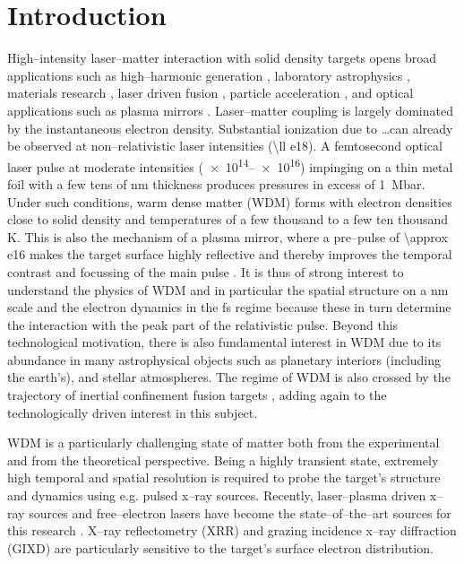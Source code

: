\documentclass[preprint, 12pt]{elsarticle}
\begin{document}
\section{Introduction}
\label{S:1}

High--intensity laser--matter interaction with solid density targets opens
broad applications such as high--harmonic generation \cite{}, laboratory
astrophysics \cite{}, materials research \cite{}, laser driven fusion
\cite{}, particle acceleration \cite{}, and optical applications such as plasma
mirrors \cite{}.
Laser--matter coupling is largely dominated by the instantaneous electron density.
Substantial ionization due to \ldots can already be observed at
non--relativistic laser intensities (\SI{\ll
e18}{\Wsqcm}). A femtosecond optical laser pulse at moderate intensities
(\SIrange{e14}{e16}{\Wsqcm}) impinging on a thin
metal foil with a few tens of \si{\nm} thickness produces pressures in excess of
\SI{1}{\mega\bar}. Under such conditions, warm dense matter (WDM) forms
with electron densities close to solid density and temperatures of a few
thousand to a few ten thousand \si{\K}. This is also the mechanism of a plasma
mirror, where a pre--pulse of  \SI{\approx e16}{\Wsqcm} makes the target surface
highly reflective and thereby improves the temporal contrast and focussing of
the main pulse .
It is thus of strong interest to understand
the physics of WDM and in particular the spatial structure on a \si{\nm} scale
and the electron dynamics in the \si{\fs} regime
because these in turn determine the interaction with the peak
part of the relativistic pulse.
Beyond this technological motivation, there is also fundamental interest in WDM
due to its abundance in many astrophysical objects \cite{Nettelmann2008a}
such as planetary
interiors (including the earth's), and stellar atmospheres. The regime of WDM
is also crossed by the trajectory of inertial confinement fusion targets \cite{Lindl2004}, adding
again to the technologically driven interest in this subject.

WDM is a particularly challenging state of matter both from the experimental and from the
theoretical perspective. Being a highly transient state, extremely high temporal
and spatial resolution is required to probe the target's structure and dynamics
using e.g. pulsed x--ray sources. Recently, laser--plasma driven x--ray sources
and free--electron lasers have become the state--of--the--art sources for this
research \cite{Lee2003, Lee2003a}.
X--ray reflectometry (XRR) and grazing incidence x--ray diffraction (GIXD) \cite{TBC} are particularly
sensitive to the target's surface electron distribution.
\end{document}
